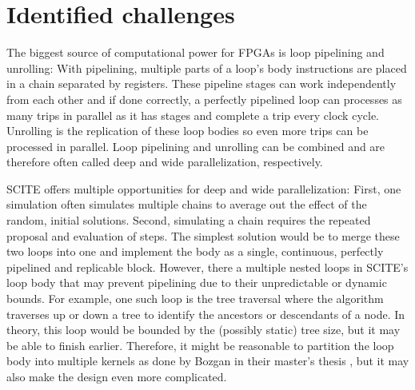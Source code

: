 \section{Identified challenges}

The biggest source of computational power for \acp{FPGA} is loop pipelining and unrolling: With pipelining, multiple parts of a loop's body instructions are placed in a chain separated by registers. These pipeline stages can work independently from each other and if done correctly, a perfectly pipelined loop can processes as many trips in parallel as it has stages and complete a trip every clock cycle. Unrolling is the replication of these loop bodies so even more trips can be processed in parallel. Loop pipelining and unrolling can be combined and are therefore often called deep and wide parallelization, respectively.

\ac{SCITE} offers multiple opportunities for deep and wide parallelization: First, one simulation often simulates multiple chains to average out the effect of the random, initial solutions. Second, simulating a chain requires the repeated proposal and evaluation of steps. The simplest solution would be to merge these two loops into one and implement the body as a single, continuous, perfectly pipelined and replicable block. However, there a multiple nested loops in \ac{SCITE}'s loop body that may prevent pipelining due to their unpredictable or dynamic bounds. For example, one such loop is the tree traversal where the algorithm traverses up or down a tree to identify the ancestors or descendants of a node. In theory, this loop would be bounded by the (possibly static) tree size, but it may be able to finish earlier. Therefore, it might be reasonable to partition the loop body into multiple kernels as done by Bozgan in their master's thesis \cite{bozgan_2019}, but it may also make the design even more complicated.

